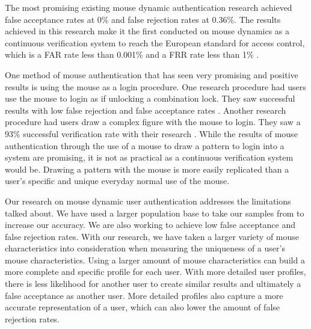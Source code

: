 \documentclass[conference]{IEEEtran}
\begin{document}
The most promising existing mouse dynamic authentication research achieved false acceptance rates at 0\% and false rejection rates at 0.36\%. The results achieved in this research make it the first conducted on mouse dynamics as a continuous verification system to reach the European standard for access control, which is a FAR rate less than 0.001\% and a FRR rate less than 1\% \cite{Nak}.

One method of mouse authentication that has seen very promising and positive results is using the mouse as a login procedure. One research procedure had users use the mouse to login as if unlocking a combination lock. They saw successful results with low false rejection and false acceptance rates \cite{HJ}. Another research procedure had users draw a complex figure with the mouse to login. They saw a 93\% successful verification rate with their research \cite{Syu}. While the results of mouse authentication through the use of a mouse to draw a pattern to login into a system are promising, it is not as practical as a continuous verification system would be. Drawing a pattern with the mouse is more easily replicated than a user’s specific and unique everyday normal use of the mouse.   

Our research on mouse dynamic user authentication addresses the limitations talked about. We have used a larger population base to take our samples from to increase our accuracy. We are also working to achieve low false acceptance and false rejection rates. With our research, we have taken a larger variety of mouse characteristics into consideration when measuring the uniqueness of a user’s mouse characteristics. Using a larger amount of mouse characteristics can build a more complete and specific profile for each user. With more detailed user profiles, there is less likelihood for another user to create similar results and ultimately a false acceptance as another user. More detailed profiles also capture a more accurate representation of a user, which can also lower the amount of false rejection rates.
\end{document}
